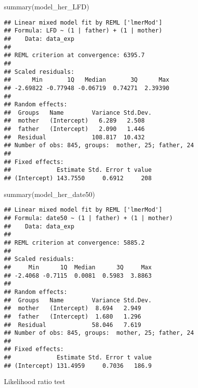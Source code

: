 \documentclass[
]{article}
\newenvironment{Shaded}{\begin{snugshade}}{\end{snugshade}}
\newcommand{\FunctionTok}[1]{\textcolor[rgb]{0.00,0.00,0.00}{#1}}
\newcommand{\NormalTok}[1]{#1}
\begin{document}
\begin{Shaded}
\begin{Highlighting}[]
\FunctionTok{summary}\NormalTok{(model\_her\_LFD)}
\end{Highlighting}
\end{Shaded}

\begin{verbatim}
## Linear mixed model fit by REML ['lmerMod']
## Formula: LFD ~ (1 | father) + (1 | mother)
##    Data: data_exp
## 
## REML criterion at convergence: 6395.7
## 
## Scaled residuals: 
##      Min       1Q   Median       3Q      Max 
## -2.69822 -0.77948 -0.06719  0.74271  2.39390 
## 
## Random effects:
##  Groups   Name        Variance Std.Dev.
##  mother   (Intercept)   6.289   2.508  
##  father   (Intercept)   2.090   1.446  
##  Residual             108.817  10.432  
## Number of obs: 845, groups:  mother, 25; father, 24
## 
## Fixed effects:
##             Estimate Std. Error t value
## (Intercept) 143.7550     0.6912     208
\end{verbatim}

\begin{Shaded}
\begin{Highlighting}[]
\FunctionTok{summary}\NormalTok{(model\_her\_date50)}
\end{Highlighting}
\end{Shaded}

\begin{verbatim}
## Linear mixed model fit by REML ['lmerMod']
## Formula: date50 ~ (1 | father) + (1 | mother)
##    Data: data_exp
## 
## REML criterion at convergence: 5885.2
## 
## Scaled residuals: 
##     Min      1Q  Median      3Q     Max 
## -2.4068 -0.7115  0.0081  0.5983  3.8863 
## 
## Random effects:
##  Groups   Name        Variance Std.Dev.
##  mother   (Intercept)  8.694   2.949   
##  father   (Intercept)  1.680   1.296   
##  Residual             58.046   7.619   
## Number of obs: 845, groups:  mother, 25; father, 24
## 
## Fixed effects:
##             Estimate Std. Error t value
## (Intercept) 131.4959     0.7036   186.9
\end{verbatim}

Likelihood ratio test
\end{document}
